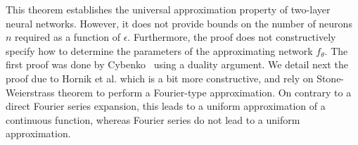 This theorem establishes the universal approximation property of two-layer neural networks. However, it does not provide bounds on the number of neurons $n$ required as a function of $\epsilon$. Furthermore, the proof does not constructively specify how to determine the parameters of the approximating network $f_\theta$. 
%
The first proof was done by Cybenko~\cite{cybenko1989approximation} using a duality argument. We detail next the proof due to Hornik et al. which is a bit more constructive, and rely on Stone-Weierstrass theorem to perform a Fourier-type approximation. On contrary to a direct Fourier series expansion, this leads to a uniform approximation of a continuous function, whereas Fourier series do not lead to a uniform approximation.



